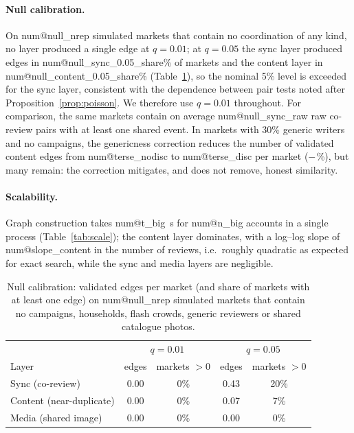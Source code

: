\documentclass[pdflatex,sn-basic]{sn-jnl}
\makeatletter
\theoremstyle{thmstyleone}
\theoremstyle{thmstylethree}
\newcommand{\num}[1]{\csname num@#1\endcsname}
\makeatother
\begin{document}
\paragraph{Null calibration.} On \num{null_nrep} simulated markets that contain no coordination of any kind, no layer produced a single edge at $q=0.01$; at $q=0.05$ the sync layer produced edges in \num{null_sync_0.05_share}\% of markets and the content layer in \num{null_content_0.05_share}\% (Table~\ref{tab:null}), so the nominal 5\% level is exceeded for the sync layer, consistent with the dependence between pair tests noted after Proposition~\ref{prop:poisson}. We therefore use $q=0.01$ throughout. For comparison, the same markets contain on average \num{null_sync_raw} raw co-review pairs with at least one shared event. In markets with 30\% generic writers and no campaigns, the genericness correction reduces the number of validated content edges from \num{terse_nodisc} to \num{terse_disc} per market ($-\num{terse_red}$\%), but many remain: the correction mitigates, and does not remove, honest similarity. \paragraph{Scalability.} Graph construction takes \num{t_big}~s for \num{n_big} accounts in a single process (Table~\ref{tab:scale}); the content layer dominates, with a log--log slope of \num{slope_content} in the number of reviews, i.e.\ roughly quadratic as expected for exact search, while the sync and media layers are negligible.

\begin{table}[t]
\caption{Null calibration: validated edges per market (and share of markets with at least one edge) on \num{null_nrep} simulated markets that contain no campaigns, households, flash crowds, generic reviewers or shared catalogue photos.}\label{tab:null}
\small\setlength{\tabcolsep}{3pt}
\begin{tabular}{@{}lcccc@{}}
\toprule
 & \multicolumn{2}{c}{$q=0.01$} & \multicolumn{2}{c}{$q=0.05$} \\
Layer & edges & markets $>0$ & edges & markets $>0$ \\
\midrule
Sync (co-review) & 0.00 & 0\% & 0.43 & 20\% \\
Content (near-duplicate) & 0.00 & 0\% & 0.07 & 7\% \\
Media (shared image) & 0.00 & 0\% & 0.00 & 0\% \\
\bottomrule
\end{tabular}
\end{table}
\end{document}
